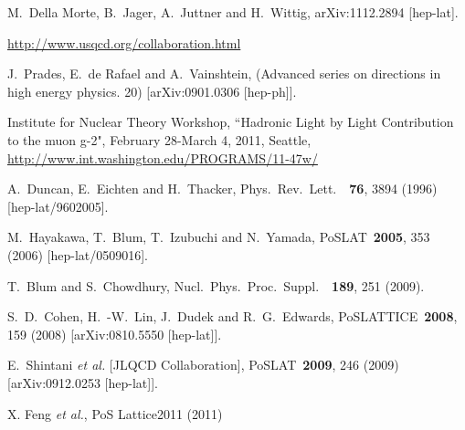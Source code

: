 \begin{thebibliography}{99}
  M.~Della Morte, B.~Jager, A.~Juttner and H.~Wittig,
  arXiv:1112.2894 [hep-lat].
  
\url{http://www.usqcd.org/collaboration.html}

  J.~Prades, E.~de Rafael and A.~Vainshtein,
  (Advanced series on directions in high energy physics. 20)
  [arXiv:0901.0306 [hep-ph]].

Institute for Nuclear Theory Workshop, ``Hadronic Light by Light Contribution to the muon g-2", February 28-March 4, 2011, Seattle, \url{http://www.int.washington.edu/PROGRAMS/11-47w/}

  A.~Duncan, E.~Eichten and H.~Thacker,
  Phys.\ Rev.\ Lett.\ \ {\bf 76}, 3894  (1996)
  [hep-lat/9602005].

  M.~Hayakawa, T.~Blum, T.~Izubuchi and N.~Yamada,
  PoSLAT\ {\bf 2005}, 353  (2006)
  [hep-lat/0509016].

  T.~Blum and S.~Chowdhury,
  Nucl.\ Phys.\ Proc.\ Suppl.\ \ {\bf 189}, 251  (2009).

  S.~D.~Cohen, H.~-W.~Lin, J.~Dudek and R.~G.~Edwards,
  PoSLATTICE\ {\bf 2008}, 159  (2008)
  [arXiv:0810.5550 [hep-lat]].


  E.~Shintani {\it et al.} [JLQCD Collaboration],
  PoSLAT\ {\bf 2009}, 246  (2009)
  [arXiv:0912.0253 [hep-lat]].

X. Feng {\it et al.}, PoS Lattice2011 (2011)



\end{thebibliography}
